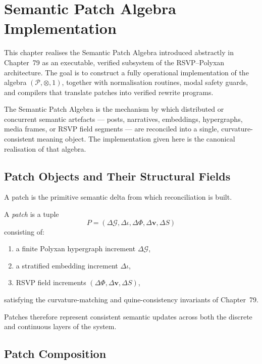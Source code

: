 \chapter{Semantic Patch Algebra Implementation}
\label{ch:52}

This chapter realises the Semantic Patch Algebra introduced abstractly in
Chapter~79 as an executable, verified subsystem of the RSVP--Polyxan
architecture.  
The goal is to construct a fully operational implementation of the algebra
$(\mathcal{P},\otimes,1)$, together with normalisation routines, modal safety
guards, and compilers that translate patches into verified rewrite programs.

The Semantic Patch Algebra is the mechanism by which distributed or concurrent
semantic artefacts --- posts, narratives, embeddings, hypergraphs, media frames,
or RSVP field segments --- are reconciled into a single, curvature-consistent
meaning object.  
The implementation given here is the canonical realisation of that algebra.


\section{Patch Objects and Their Structural Fields}
\label{sec:52:patch-objects}

A patch is the primitive semantic delta from which reconciliation is built.

\begin{definition}
A \emph{patch} is a tuple
\[
P = (\Delta\mathcal{G},\Delta\iota,\Delta\Phi,\Delta \mathbf{v},\Delta S)
\]
consisting of:
\begin{enumerate}
  \item a finite Polyxan hypergraph increment $\Delta\mathcal{G}$,
  \item a stratified embedding increment $\Delta\iota$,
  \item RSVP field increments $(\Delta\Phi,\Delta \mathbf{v},\Delta S)$,
\end{enumerate}
satisfying the curvature-matching and quine-consistency invariants of
Chapter~79.
\end{definition}

Patches therefore represent consistent semantic updates across both the discrete
and continuous layers of the system.


\section{Patch Composition}
\label{sec:52:patch-composition}

